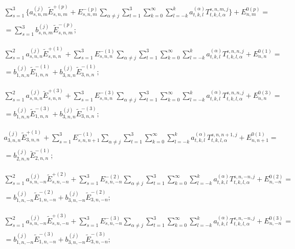 \begin{multline}
\sum_{s=1}^3 \bigg\{a_{s,n,m}^{(j)}{\tilde E}_{s,n,m}^{+(p)}+E_{s,n,m}^{-(p)}\sum _{\alpha\neq j} \sum _{t=1}^3 \sum _{k=0}^{\infty}\sum_{l=-k}^k a_{t,k,l}^{(\alpha)} T_{t,k,l,\alpha}^{s,n,m,j}\bigg\}+E_{n,m}^{0(p)}= \\
=\sum_{s=1}^3 b_{s,n,m}^{(j)}{\tilde E}_{s,n,m}^{-(p)};
\label{eq:13:1b}
\end{multline}

\begin{multline}
\sum_{s=1}^2 a_{s,n,n}^{(j)}{\tilde E}_{s,n,n}^{+(1)}+\sum_{s=1}^3 E_{s,n,n}^{-(1)}\sum _{\alpha\neq j} \sum _{t=1}^3 \sum _{k=0}^{\infty}\sum_{l=-k}^k a_{t,k,l}^{(\alpha)} T_{t,k,l,\alpha}^{s,n,n,j}+E_{n,n}^{0(1)}= \\
=b_{1,n,n}^{(j)}{\tilde E}_{1,n,n}^{-(1)}+b_{3,n,n}^{(j)}{\tilde E}_{3,n,n}^{-(1)};
\label{eq:13:2b}
\end{multline}

\begin{multline}
\sum _{s=1}^2 a_{s,n,n}^{(j)}{\tilde E}_{s,n,n}^{+(3)}+\sum_{s=1}^3 E_{s,n,n}^{-(3)}\sum _{\alpha\neq j} \sum _{t=1}^3 \sum _{k=0}^{\infty}\sum_{l=-k}^k a_{t,k,l}^{(\alpha)} T_{t,k,l,\alpha}^{s,n,n,j}+E_{n,n}^{0(3)}= \\
=b_{1,n,n}^{(j)}{\tilde E}_{1,n,n}^{-(3)}+b_{3,n,n}^{(j)}{\tilde E}_{3,n,n}^{-(3)};
\label{eq:13:3b}
\end{multline}

\begin{multline}
a_{3,n,n}^{(j)}{\tilde E}_{3,n,n}^{+(1)}+\sum_{s=1}^3 E_{s,n,n+1}^{-(1)}\sum _{\alpha\neq j} \sum _{t=1}^3 \sum _{k=0}^{\infty}\sum_{l=-k}^k a_{t,k,l}^{(\alpha)} T_{t,k,l,\alpha}^{s,n,n+1,j}+E_{n,n+1}^{0(1)}= \\
=b_{2,n,n}^{(j)}{\tilde E}_{2,n,n}^{-(1)};
\label{eq:13:4b}
\end{multline}

\begin{multline}
\sum _{s=1}^2 a_{s,n,-n}^{(j)}{\tilde E}_{s,n,-n}^{+(2)}+\sum_{s=1}^3 E_{s,n,-n}^{-(2)}\sum _{\alpha\neq j} \sum _{t=1}^3 \sum _{k=0}^{\infty}\sum_{l=-k}^k a_{t,k,l}^{(\alpha)} T_{t,k,l,\alpha}^{s,n,-n,j}+E_{n,-n}^{0(2)}= \\
=b_{1,n,-n}^{(j)}{\tilde E}_{1,n,-n}^{-(2)}+b_{3,n,-n}^{(j)}{\tilde E}_{3,n,-n}^{-(2)};
\label{eq:13:5b}
\end{multline}

\begin{multline}
\sum _{s=1}^2 a_{s,n,-n}^{(j)}{\tilde E}_{s,n,-n}^{+(3)}+\sum_{s=1}^3 E_{s,n,-n}^{-(3)}\sum _{\alpha\neq j} \sum _{t=1}^3 \sum _{k=0}^{\infty}\sum_{l=-k}^k a_{t,k,l}^{(\alpha)} T_{t,k,l,\alpha}^{s,n,-n,j}+E_{n,-n}^{0(3)}= \\
=b_{1,n,-n}^{(j)}{\tilde E}_{1,n,-n}^{-(3)}+b_{3,n,-n}^{(j)}{\tilde E}_{3,n,-n}^{-(3)};
\label{eq:13:6b}
\end{multline}


